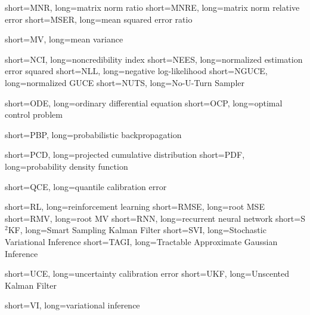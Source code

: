 		{short={MNR},	    	long={matrix norm ratio}}
		{short={MNRE},	    	long={matrix norm relative  error}}
		{short={MSER},	    	long={mean squared error ratio}}

		{short={MV},	    	long={mean variance}}




		{short={NCI},	    	long={noncredibility index}}
      {short={NEES},	    	long={normalized estimation error squared}}
       {short={NLL},	    	long={negative log-likelihood}}
      {short={NGUCE},	    	long={normalized \ac{GUCE}}}
      {short={NUTS},	    	long={No-U-Turn Sampler}}


	    {short={ODE},	    	long={ordinary differential equation}}
	    {short={OCP},	    	long={optimal control problem}}

		{short={PBP},	    	long={probabilistic backpropagation}}

		{short={PCD},	    	long={projected cumulative distribution}}
		{short={PDF},	    	long={probability density function}}

		{short={QCE},	    	long={quantile calibration error}}

         {short={RL},            long={reinforcement learning}}
		{short={RMSE},	    	long={root \ac{MSE}}}
		{short={RMV},	    	long={root \ac{MV}}}
		{short={RNN},	    	long={recurrent neural network}}
	    {short={S$^2$KF},	    long={Smart Sampling Kalman Filter}}
		{short={SVI},	    	long={Stochastic Variational Inference}}
		{short={TAGI},	    	long={Tractable Approximate Gaussian Inference}}

		{short={UCE},	    	long={uncertainty calibration error}}
		{short={UKF},	    	long={Unscented Kalman Filter}}

		    {short={VI},	    	long={variational inference}}











